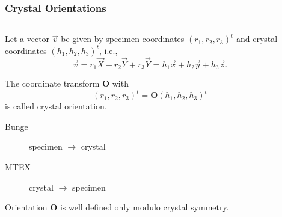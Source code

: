 \documentclass[compress]{beamer}
\begin{document}
\begin{frame}
  \frametitle{Crystal Orientations}

  \begin{columns}

    \begin{column}{6.3cm}

      \begin{overlayarea}{6.4cm}{8cm}
        Let a vector $\vec v$ be given by specimen coordinates
        $(r_{1},r_{2},r_{3})^{t}$ \underline{and} crystal coordinates
        $(h_{1},h_{2},h_{3})^{t}$, i.e.,
        \begin{equation*}
          \vec v = r_{1} \vec X + r_{2} \vec Y + r_{3} \vec Y
                 = h_{1} \vec x + h_{2} \vec y + h_{3} \vec z.
        \end{equation*}

        \pause

        The coordinate transform $\mathbf O$ with
      \begin{equation*}
        \left(r_{1},r_{2},r_{3}\right)^{t}
        =
         \mathbf O
         \left(
          h_{1},h_{2},h_{3} \right)^{t}
      \end{equation*}
      is called \alert{crystal orientation}.

      \pause
      \medskip

      \begin{alertblock}{}
        \begin{description}
        \item[Bunge] specimen $\rightarrow$ crystal
        \item[MTEX] crystal $\rightarrow$ specimen
        \end{description}
      \end{alertblock}



      \pause
      \medskip

      Orientation $\mathbf O$ is well defined only modulo crystal
      symmetry.

    \end{overlayarea}
  \end{column}

    \begin{column}{5cm}

      \begin{tikzpicture}[scale=0.5]


\end{tikzpicture}
\end{column}
\end{columns}
\end{frame}
\end{document}

